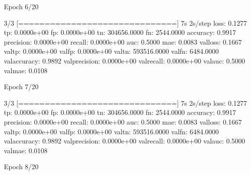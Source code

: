 \documentclass[letterpaper,10pt,english]{sphinxmanual}
\begin{document}
\begin{sphinxVerbatim}[commandchars=\\\{\}]
Epoch 6/20
\end{sphinxVerbatim}

\begin{sphinxVerbatim}[commandchars=\\\{\}]
3/3 [==============================] \PYGZhy{} 7s 2s/step \PYGZhy{} loss: 0.1277 \PYGZhy{} tp: 0.0000e+00 \PYGZhy{} fp: 0.0000e+00 \PYGZhy{} tn: 304656.0000 \PYGZhy{} fn: 2544.0000 \PYGZhy{} accuracy: 0.9917 \PYGZhy{} precision: 0.0000e+00 \PYGZhy{} recall: 0.0000e+00 \PYGZhy{} auc: 0.5000 \PYGZhy{} mae: 0.0083 \PYGZhy{} val\PYGZus{}loss: 0.1667 \PYGZhy{} val\PYGZus{}tp: 0.0000e+00 \PYGZhy{} val\PYGZus{}fp: 0.0000e+00 \PYGZhy{} val\PYGZus{}tn: 593516.0000 \PYGZhy{} val\PYGZus{}fn: 6484.0000 \PYGZhy{} val\PYGZus{}accuracy: 0.9892 \PYGZhy{} val\PYGZus{}precision: 0.0000e+00 \PYGZhy{} val\PYGZus{}recall: 0.0000e+00 \PYGZhy{} val\PYGZus{}auc: 0.5000 \PYGZhy{} val\PYGZus{}mae: 0.0108
\end{sphinxVerbatim}

\begin{sphinxVerbatim}[commandchars=\\\{\}]
Epoch 7/20
\end{sphinxVerbatim}

\begin{sphinxVerbatim}[commandchars=\\\{\}]
3/3 [==============================] \PYGZhy{} 7s 2s/step \PYGZhy{} loss: 0.1277 \PYGZhy{} tp: 0.0000e+00 \PYGZhy{} fp: 0.0000e+00 \PYGZhy{} tn: 304656.0000 \PYGZhy{} fn: 2544.0000 \PYGZhy{} accuracy: 0.9917 \PYGZhy{} precision: 0.0000e+00 \PYGZhy{} recall: 0.0000e+00 \PYGZhy{} auc: 0.5000 \PYGZhy{} mae: 0.0083 \PYGZhy{} val\PYGZus{}loss: 0.1667 \PYGZhy{} val\PYGZus{}tp: 0.0000e+00 \PYGZhy{} val\PYGZus{}fp: 0.0000e+00 \PYGZhy{} val\PYGZus{}tn: 593516.0000 \PYGZhy{} val\PYGZus{}fn: 6484.0000 \PYGZhy{} val\PYGZus{}accuracy: 0.9892 \PYGZhy{} val\PYGZus{}precision: 0.0000e+00 \PYGZhy{} val\PYGZus{}recall: 0.0000e+00 \PYGZhy{} val\PYGZus{}auc: 0.5000 \PYGZhy{} val\PYGZus{}mae: 0.0108
\end{sphinxVerbatim}

\begin{sphinxVerbatim}[commandchars=\\\{\}]
Epoch 8/20
\end{sphinxVerbatim}
\end{document}
